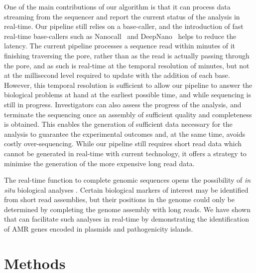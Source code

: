 One of the main contributions of our algorithm is that it can process data
streaming from the sequencer and report the current status of the analysis in
real-time. 
Our pipeline still relies on a base-caller, and the introduction of
fast real-time base-callers such as Nanocall~\cite{DavidDY2016} and
DeepNano~\cite{BozaBV2016} helps to reduce the latency. 
The current pipeline processes a sequence read within minutes 
of it finishing traversing the pore, rather than as the read is actually passing 
through the pore, and as such is real-time at the temporal resolution of minutes, 
but not at the millisecond level required to update with the addition of each 
base. However, this temporal resolution is sufficient to allow our pipeline 
to answer the biological problems at hand 
at the earliest possible time, and while sequencing is still in progress.
Investigators can also assess the progress of the analysis, and terminate 
the sequencing once an assembly of sufficient quality and completeness is
obtained. This enables the generation of sufficient data necessary for the 
analysis to guarantee the experimental outcomes and, at the same time, avoids
costly over-sequencing. 
While our pipeline still requires short read data which cannot
be generated in real-time with current technology, it offers a strategy to
minimise the generation of the more expensive long read data.


The real-time function to complete genomic sequences opens the possibility of
\emph{in situ} biological analyses \cite{CaoGE2016}. Certain biological markers
of interest may be identified from short read assemblies, but their positions in
the genome could only be determined by completing the genome assembly with long
reads. We have shown that \npscarf{} can facilitate such analyses in real-time by
demonstrating the identification of AMR genes encoded in
plasmids and pathogenicity islands.


\section{Methods}

